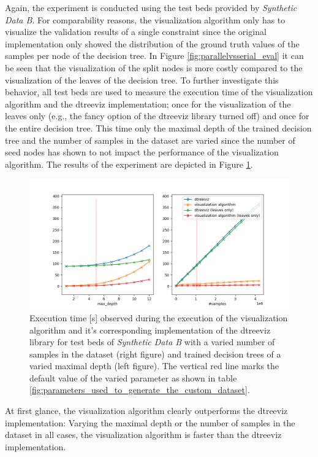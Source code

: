 Again, the experiment is conducted using the test beds provided by \textit{Synthetic Data B}. For comparability reasons, the visualization algorithm only has to visualize the validation results of a single constraint since the original implementation only showed the distribution of the ground truth values of the samples per node of the decision tree. In Figure \ref{fig:parallelvsserial_eval} it can be seen that the visualization of the split nodes is more costly compared to the visualization of the leaves of the decision tree. To further investigate this behavior, all test beds are used to measure the execution time of the visualization algorithm and the dtreeviz implementation; once for the visualization of the leaves only (e.g., the fancy option of the dtreeviz library turned off) and once for the entire decision tree. This time only the maximal depth of the trained decision tree and the number of samples in the dataset are varied since the number of seed nodes has shown to not impact the performance of the visualization algorithm. The results of the experiment are depicted in Figure \ref{fig:dtreevizComparison}.

\begin{figure}
    \centering
    \includegraphics[width=\textwidth]{images/evaluation/dtreevizComparison.png}
    \caption{Execution time [s] observed during the execution of the visualization algorithm and it's corresponding implementation of the dtreeviz library for test beds of \textit{Synthetic Data B} with a varied number of samples in the dataset (right figure) and trained decision trees of a varied maximal depth (left figure). The vertical red line marks the default value of the varied parameter as shown in table \ref{fig:parameters_used_to_generate_the_custom_dataset}.}
    \label{fig:dtreevizComparison}
\end{figure}

At first glance, the visualization algorithm clearly outperforms the dtreeviz implementation: Varying the maximal depth or the number of samples in the dataset in all cases, the visualization algorithm is faster than the dtreeviz implementation.

